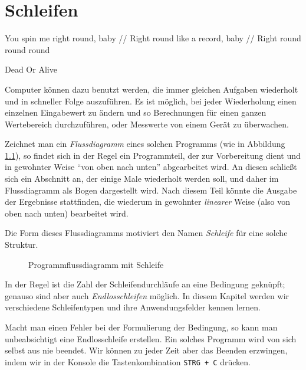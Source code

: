 \chapter{Schleifen} \label{chp:loops}
\epigraph{You spin me right round, baby // Right round like a record, baby // Right round round round}
{Dead Or Alive}

Computer können dazu benutzt werden, die immer gleichen Aufgaben wiederholt und in schneller Folge auszuführen. Es ist möglich, bei jeder Wiederholung einen einzelnen Eingabewert zu ändern und so \eg Berechnungen für einen ganzen Wertebereich durchzuführen, oder Messwerte von einem Gerät zu überwachen.

Zeichnet man ein \emph{Flussdiagramm} eines solchen Programms (wie in Abbildung \ref{fig:FlowBasicLoop}), so findet sich in der Regel ein Programmteil, der zur Vorbereitung dient und in gewohnter Weise \enquote{von oben nach unten} abgearbeitet wird. An diesen schließt sich ein Abschnitt an, der einige Male wiederholt werden soll, und daher im Flussdiagramm als Bogen dargestellt wird. Nach diesem Teil könnte die Ausgabe der Ergebnisse stattfinden, die wiederum in gewohnter \emph{linearer} Weise (also von oben nach unten) bearbeitet wird.

Die Form dieses Flussdiagramms motiviert den Namen \emph{Schleife} für eine solche Struktur.

\begin{figure}[h!]
\begin{center}
\caption{Programmflussdiagramm mit Schleife} \label{fig:FlowBasicLoop}
\end{center}
\end{figure}

In der Regel ist die Zahl der Schleifendurchläufe an eine Bedingung geknüpft; genauso sind aber auch \emph{Endlosschleifen} möglich. In diesem Kapitel werden wir verschiedene Schleifentypen und ihre Anwendungsfelder kennen lernen.

\begin{hintbox}
Macht man einen Fehler bei der Formulierung der Bedingung, so kann man unbeabsichtigt eine Endlosschleife erstellen. Ein solches Programm wird von sich selbst aus nie beendet. Wir können zu jeder Zeit aber das Beenden erzwingen, indem wir in der Konsole die Tastenkombination \texttt{STRG + C} drücken.
\end{hintbox}

